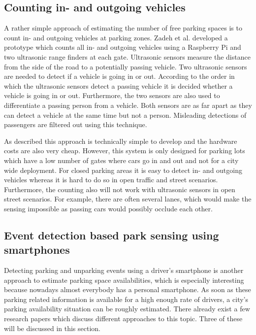 \subsection{Counting in- and outgoing vehicles}
\label{sec:counting_in_out_park_sensing}

A rather simple approach of estimating the number of free parking spaces is to count in- and outgoing vehicles at parking zones. Zadeh et al. \cite{smarturbanparkingdetection} developed a prototype which counts all in- and outgoing vehicles using a Raspberry Pi and two ultrasonic range finders at each gate. Ultrasonic sensors measure the distance from the side of
the road to a potentially passing vehicle. Two ultrasonic sensors are needed to detect if a vehicle is going in or out. According to the order in which the ultrasonic sensors detect a passing vehicle it is decided whether a vehicle is going in or out. Furthermore,
the two sensors are also used to differentiate a passing person from a vehicle. Both sensors are as far apart as they can detect a vehicle at the same time but not a person. Misleading detections of passengers are filtered out using this technique.

As described this approach is technically simple to develop and the hardware costs are also very cheap. However, this system is only designed for parking lots which have a low number of gates where cars go in and out and not for a city wide deployment. For closed parking areas it is easy to detect in- and outgoing vehicles whereas it is hard to do so in open traffic and street scenarios. Furthermore, the counting also will not work with ultrasonic sensors in open street scenarios. For example, there are often several lanes, which would make the sensing impossible as passing cars would possibly occlude each other.







\subsection{Event detection based park sensing using smartphones}
\label{sec:event_detection_park_sensing}

Detecting parking and unparking events using a driver's smartphone is another approach to estimate parking space availabilities, which is especially interesting because nowadays almost everybody has a personal smartphone. As soon as these parking related information is available for a high enough rate of drivers, a city's parking availability situation can be roughly estimated. There already exist a few research papers which discuss different approaches to this topic. Three of these will be discussed in this
section.

